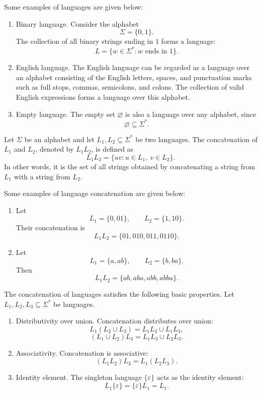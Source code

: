 \documentclass[10pt,a4paper]{article}
\begin{document}
Some examples of languages are given below:
\begin{enumerate}
    \item \textcolor{violet!70!black}{\textsf{Binary language.}} Consider the alphabet
    \[
        \Sigma=\{0,1\}.
    \]
    The collection of all binary strings ending in $1$ forms a language:
    \[
        L=\{w\in\Sigma^*:w\text{ ends in }1\}.
    \]

    \item \textcolor{violet!70!black}{\textsf{English language.}} The English language can be regarded as a language over an alphabet consisting of the English letters, spaces, and punctuation marks such as full stops, commas, semicolons, and colons. The collection of valid English expressions forms a language over this alphabet.

    \item \textcolor{violet!70!black}{\textsf{Empty language.}} The empty set $\varnothing$ is also a language over any alphabet, since
    \[
        \varnothing\subseteq\Sigma^*.
    \]
\end{enumerate}

\begin{definition}
Let $\Sigma$ be an alphabet and let $L_1,L_2\subseteq\Sigma^*$ be two languages. The \textsf{concatenation} of $L_1$ and $L_2$, denoted by $L_1L_2$, is defined as
\[
    L_1L_2=\{uv:u\in L_1,\ v\in L_2\}.
\]
In other words, it is the set of all strings obtained by concatenating a string from $L_1$ with a string from $L_2$.
\end{definition}

Some examples of language concatenation are given below:
\begin{enumerate}
    \item Let
    \[
        L_1=\{0,01\},\qquad L_2=\{1,10\}.
    \]
    Their concatenation is
    \[
        L_1L_2=\{01,010,011,0110\}.
    \]

    \item Let
    \[
        L_1=\{a,ab\},\qquad L_2=\{b,ba\}.
    \]
    Then
    \[
        L_1L_2=\{ab,aba,abb,abba\}.
    \]
\end{enumerate}

The concatenation of languages satisfies the following basic properties. Let $L_1,L_2,L_3\subseteq\Sigma^*$ be languages.
\begin{enumerate}
    \item \textcolor{violet!70!black}{\textsf{Distributivity over union.}} Concatenation distributes over union:
    \[
        L_1(L_2\cup L_3)
        =L_1L_2\cup L_1L_3,
    \]
    \[
        (L_1\cup L_2)L_3
        =L_1L_3\cup L_2L_3.
    \]

    \item \textcolor{violet!70!black}{\textsf{Associativity.}} Concatenation is associative:
    \[
        (L_1L_2)L_3=L_1(L_2L_3).
    \]

    \item \textcolor{violet!70!black}{\textsf{Identity element.}} The singleton language $\{\varepsilon\}$ acts as the identity element:
    \[
        L_1\{\varepsilon\}
        =\{\varepsilon\}L_1=L_1.
    \]
\end{enumerate}
\end{document}
